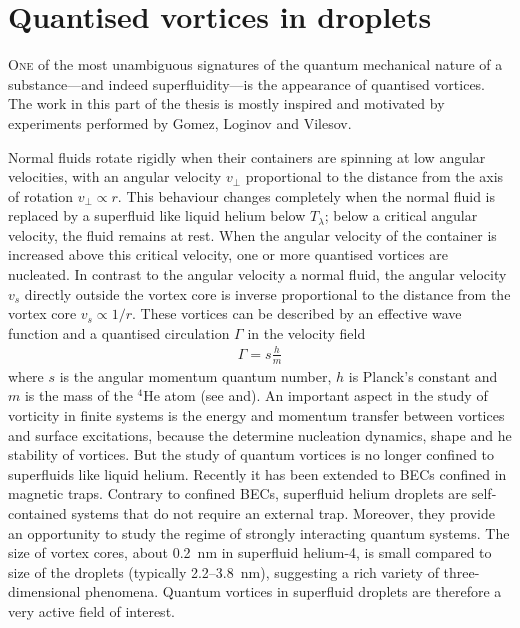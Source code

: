 \chapter{Quantised vortices in droplets}\label{sec:quant-vort}
	\lettrine[lines=4]{\color{activeColor}O}{ne} of the most unambiguous signatures of the quantum mechanical nature of a substance---and indeed superfluidity---is the appearance of quantised vortices. The work in this part of the thesis is mostly inspired and motivated by experiments performed by Gomez, Loginov and Vilesov\citep{Gomez:2012,Gom14}. 
	
	Normal fluids rotate rigidly when their containers are spinning at low angular velocities, with an angular velocity $v_\perp$ proportional to the distance from the axis of rotation $v_\perp\propto r$. This behaviour changes completely when the normal fluid is replaced by a superfluid like liquid helium below $T_\lambda$; below a critical angular velocity, the fluid remains at rest. When the angular velocity of the container is increased above this critical velocity, one or more quantised vortices are nucleated. In contrast to the angular velocity a normal fluid, the angular velocity $v_s$ directly outside the vortex core is inverse proportional to the distance from the vortex core $v_s\propto 1/r$. These vortices can be described by an effective wave function and a quantised circulation $\Gamma$ in the velocity field
	\begin{align}
		\Gamma=s\frac{h}{m}	
	\end{align}
	where $s$ is the angular momentum quantum number, $h$ is Planck’s constant and $m$ is the mass of the $^4$He atom (see  and). An important aspect in the study of vorticity in finite systems is the energy and momentum transfer between vortices and surface excitations, because the determine nucleation dynamics, shape and he stability of vortices. But the study of quantum vortices is no longer confined to superfluids like liquid helium. Recently\citep{Pit03,Fetter2009} it has been extended to BECs confined in magnetic traps. Contrary to confined BECs, superfluid helium droplets are self-contained systems that do not require an external trap. Moreover, they provide an opportunity to study the regime of  strongly interacting quantum systems. The size of vortex cores, about 0.2~nm\citep{Don91} in superfluid helium-4, is small compared to size of the droplets (typically 2.2--3.8~nm), suggesting a rich variety of three-dimensional phenomena. Quantum vortices in superfluid droplets are therefore a very active field of interest\citep{Clo98,Lehmann2003,Bar06,Sti06}. 
	
